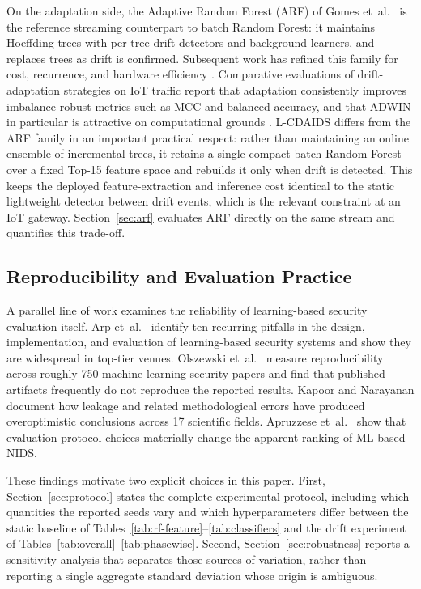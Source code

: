 \documentclass[11pt,a4paper]{article}
\begin{document}
On the adaptation side, the Adaptive Random Forest (ARF) of Gomes
et~al.\ \cite{gomes2017} is the reference streaming counterpart to batch
Random Forest: it maintains Hoeffding trees with per-tree drift
detectors and background learners, and replaces trees as drift is
confirmed. Subsequent work has refined this family for cost, recurrence,
and hardware efficiency \cite{wu2021pearl,alqabbany2021}. Comparative
evaluations of drift-adaptation strategies on IoT traffic report that
adaptation consistently improves imbalance-robust metrics such as MCC
and balanced accuracy, and that ADWIN in particular is attractive on
computational grounds \cite{gonzalez2025,yelleti2025}. L-CDAIDS differs
from the ARF family in an important practical respect: rather than
maintaining an online ensemble of incremental trees, it retains a single
compact batch Random Forest over a fixed Top-15 feature space and
rebuilds it only when drift is detected. This keeps the deployed
feature-extraction and inference cost identical to the static
lightweight detector between drift events, which is the relevant
constraint at an IoT gateway. Section~\ref{sec:arf} evaluates ARF
directly on the same stream and quantifies this trade-off.

\subsection{Reproducibility and Evaluation Practice}

A parallel line of work examines the reliability of learning-based
security evaluation itself. Arp et~al.\ \cite{arp2024,arp2023} identify
ten recurring pitfalls in the design, implementation, and evaluation of
learning-based security systems and show they are widespread in
top-tier venues. Olszewski et~al.\ \cite{olszewski2023} measure
reproducibility across roughly 750 machine-learning security papers and
find that published artifacts frequently do not reproduce the reported
results. Kapoor and Narayanan \cite{kapoor2023} document how leakage and
related methodological errors have produced overoptimistic conclusions
across 17 scientific fields. Apruzzese et~al.\ \cite{apruzzese2022}
show that evaluation protocol choices materially change the apparent
ranking of ML-based NIDS.

These findings motivate two explicit choices in this paper. First,
Section~\ref{sec:protocol} states the complete experimental protocol,
including which quantities the reported seeds vary and which
hyperparameters differ between the static baseline of
Tables~\ref{tab:rf-feature}--\ref{tab:classifiers} and the drift
experiment of Tables~\ref{tab:overall}--\ref{tab:phasewise}. Second,
Section~\ref{sec:robustness} reports a sensitivity analysis that
separates those sources of variation, rather than reporting a single
aggregate standard deviation whose origin is ambiguous.
\end{document}
